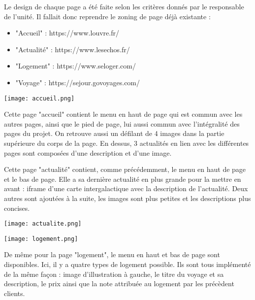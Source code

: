 Le design de chaque page a été faite selon les critères donnés par le responsable de l'unité. Il fallait donc reprendre le zoning de page déjà existante :
\begin{itemize}
    \item "Accueil" : https://www.louvre.fr/
    \item "Actualité" : https://www.lesechos.fr/
    \item "Logement" : https://www.seloger.com/
    \item "Voyage" : https://sejour.govoyages.com/
\end{itemize}
\vspace{2\baselineskip}


\begin{minipage}{0.5 \linewidth}
    \hspace{-3cm}
    \texttt{[image: accueil.png]}
\end{minipage} \hfill
\begin{minipage}{0.5 \linewidth}
    Cette page "accueil" contient le menu en haut de page qui est commun avec les autres pages, ainsi que le pied de page, lui aussi commun avec l'intégralité des pages du projet. 
    On retrouve aussi un défilant de 4 images dans la partie supérieure du corps de la page. 
    En dessus, 3 actualités en lien avec les différentes pages sont composées d'une description et d'une image.
\end{minipage}

\begin{minipage}{0.5 \linewidth}
   Cette page "actualité" contient, comme précédemment, le menu en haut de page et le bas de page. 
   Elle a sa dernière actualité en plus grande pour la mettre en avant : iframe d'une carte intergalactique avec la description de l'actualité. 
   Deux autres sont ajoutées à la suite, les images sont plus petites et les descriptions plus concises.
\end{minipage} \hfill
\begin{minipage}{0.5 \linewidth}
    \texttt{[image: actualite.png]}
\end{minipage}

\begin{minipage}{0.5 \linewidth}
    \hspace{-1cm}
    \texttt{[image: logement.png]}
\end{minipage} \hfill
\begin{minipage}{0.5 \linewidth}
    De même pour la page "logement", le menu en haut et bas de page sont disponibles.
    Ici, il y a quatre types de logement possible. 
    Ils sont tous implémenté de la même façon : image d'illustration à gauche, le titre du voyage et sa description, le prix ainsi que la note attribuée au logement par les précèdent clients.
\end{minipage}

